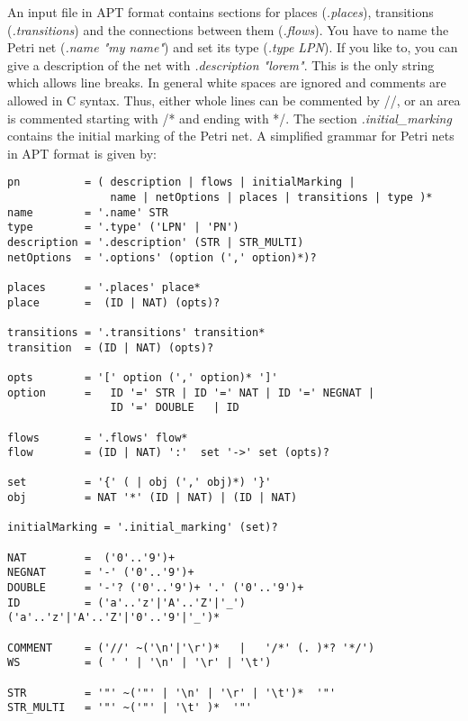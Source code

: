 \documentclass[12pt,twoside,a4paper,openright]{memoir}
\begin{document}
An input file in APT format contains sections for places (\emph{.places}), transitions (\emph{.transitions}) 
and the connections between them (\emph{.flows}). You have to name the Petri net
(\emph{.name "my name"}) and set its type (\emph{.type LPN}). If you like to, you can give a 
description of the net with \emph{.description "lorem"}.
This is the only string which allows line breaks.
In general white spaces are ignored and comments are allowed in C syntax. 
Thus, either whole lines can be commented by //, or an area is commented starting with /* and ending with */.
The section \emph{.initial\_marking} contains the initial marking of the Petri net.
A simplified grammar for Petri nets in APT format is given by:
\begin{lstlisting}[captionpos=b, caption=Simplified grammar of the APT format for labeled Petri nets., label = lst:grammar,language=ebnf]
pn     		= ( description | flows | initialMarking |
 				name | netOptions | places | transitions | type )*
name   		= '.name' STR
type   		= '.type' ('LPN' | 'PN')
description = '.description' (STR | STR_MULTI)
netOptions  = '.options' (option (',' option)*)?

places      = '.places' place*
place       =  (ID | NAT) (opts)? 

transitions = '.transitions' transition*
transition  = (ID | NAT) (opts)? 

opts 		= '[' option (',' option)* ']'
option 		= 	ID '=' STR | ID '=' NAT	| ID '=' NEGNAT |
				ID '=' DOUBLE	| ID
	
flows 		= '.flows' flow*
flow  		= (ID | NAT) ':'  set '->' set (opts)?

set			= '{' ( | obj (',' obj)*) '}'
obj			= NAT '*' (ID | NAT) | (ID | NAT)

initialMarking = '.initial_marking' (set)?

NAT			=  ('0'..'9')+
NEGNAT		= '-' ('0'..'9')+
DOUBLE		= '-'? ('0'..'9')+ '.' ('0'..'9')+
ID			= ('a'..'z'|'A'..'Z'|'_') ('a'..'z'|'A'..'Z'|'0'..'9'|'_')*

COMMENT		= ('//' ~('\n'|'\r')*	|   '/*' (. )*? '*/')
WS			= ( ' ' | '\n' | '\r' | '\t')

STR			= '"' ~('"' | '\n' | '\r' | '\t')*  '"'
STR_MULTI	= '"' ~('"' | '\t' )*  '"'
\end{lstlisting}
\end{document}

